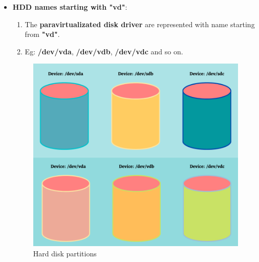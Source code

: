 \begin{flushleft}
\begin{itemize}
	\item \textbf{HDD names starting with "vd"}:
	\begin{enumerate}
	\item The \textbf{paravirtualizated disk driver} are represented with name starting from \textbf{"vd"}. 
	\item Eg: \textbf{/dev/vda}, \textbf{/dev/vdb}, \textbf{/dev/vdc} and so on.
	\end{enumerate}
	\begin{figure}[h!]
		\centering
		\includegraphics[scale=.38]{content/chapter8/images/name.png}
		\caption{Hard disk partitions}
		\label{HDD_naming}
	\end{figure}		
	\end{itemize}	
\newpage

\end{flushleft}
